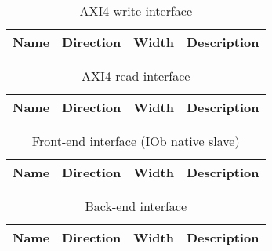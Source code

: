 \begin{table}[H]
  \centering
  \begin{tabularx}{\textwidth}{|l|l|r|X|}

    \hline
    \rowcolor{iob-green}
    {\bf Name} & {\bf Direction} & {\bf Width} & {\bf Description}  \\ \hline \hline

    

  \end{tabularx}
  \caption{AXI4 write interface}
  \label{axi_write_m_if_tab:is}
\end{table}

\begin{table}[H]
  \centering
  \begin{tabularx}{\textwidth}{|l|l|r|X|}

    \hline
    \rowcolor{iob-green}
    {\bf Name} & {\bf Direction} & {\bf Width} & {\bf Description}  \\ \hline \hline

    

  \end{tabularx}
  \caption{AXI4 read interface}
  \label{axi_read_m_if_tab:is}
\end{table}

\begin{table}[H]
  \centering
  \begin{tabularx}{\textwidth}{|l|l|r|X|}

    \hline
    \rowcolor{iob-green}
    {\bf Name} & {\bf Direction} & {\bf Width} & {\bf Description}  \\ \hline \hline

    

  \end{tabularx}
  \caption{Front-end interface (IOb native slave)}
  \label{fe_io_if_tab:is}
\end{table}

\begin{table}[H]
  \centering
  \begin{tabularx}{\textwidth}{|l|l|r|X|}

    \hline
    \rowcolor{iob-green}
    {\bf Name} & {\bf Direction} & {\bf Width} & {\bf Description}  \\ \hline \hline

    

  \end{tabularx}
  \caption{Back-end interface}
  \label{be_io_if_tab:is}
\end{table}

